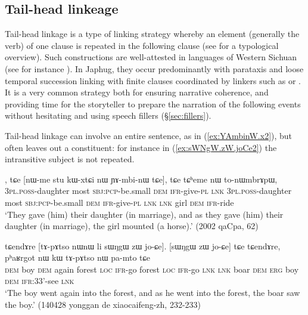 \subsection{Tail-head linkeage} \label{sec:tail.head.linkeage}
Tail-head linkage is a type of linking strategy whereby an element (generally the verb) of one clause  is repeated in the following clause (see \citealt{vries05tailhead} for a typological overview). Such constructions are well-attested in languages of Western Sichuan (see for instance \citealt[688--693]{zhangsh13ersu}). In Japhug, they occur predominantly with parataxis and loose temporal succession linking with finite clauses coordinated by linkers such as  or . It is a very common strategy both for ensuring narrative coherence, and providing time for the storyteller to prepare the narration of the following events without hesitating and using speech fillers (§\ref{sec:fillers}). 

Tail-head linkage can involve an entire sentence, as  in (\ref{ex:YAmbinW.x2}), but often leaves out a constituent: for instance in (\ref{ex:sWNgW.zW.joCe2}) the intransitive subject  is not repeated.

\begin{exe}
\ex \label{ex:YAmbinW.x2}
, tɕe [nɯ-me stu kɯ-xtɕi nɯ ɲɤ-mbi-nɯ tɕe], tɕe tɕʰeme nɯ to-nɯmbrɤpɯ, \\
\textsc{3pl}.\textsc{poss}-daughter most \textsc{sbj}:\textsc{pcp}-be.small \textsc{dem} \textsc{ifr}-give-\textsc{pl}  \textsc{lnk} \textsc{3pl}.\textsc{poss}-daughter most \textsc{sbj}:\textsc{pcp}-be.small \textsc{dem} \textsc{ifr}-give-\textsc{pl}  \textsc{lnk}  \textsc{lnk} girl \textsc{dem} \textsc{ifr}-ride \\
\glt `They gave (him) their daughter (in marriage), and as they gave (him) their daughter (in marriage),  the girl mounted (a horse).' (2002 qaCpa, 62)
\end{exe}


\begin{exe}
\ex \label{ex:sWNgW.zW.joCe2}
\gll tɕendɤre [tɤ-pɤtso nɯnɯ li sɯŋgɯ zɯ jo-ɕe]. [sɯŋgɯ zɯ jo-ɕe] tɕe tɕendɤre, pʰaʁrgot nɯ kɯ tɤ-pɤtso nɯ pa-mto tɕe \\
  \textsc{dem} boy \textsc{dem} again forest \textsc{loc} \textsc{ifr}-go  forest \textsc{loc} \textsc{ifr}-go \textsc{lnk} \textsc{lnk} boar \textsc{dem} \textsc{erg} boy \textsc{dem} \textsc{ifr}:3\fl{}3'-see \textsc{lnk}   \\
\glt `The boy went again into the forest, and as he went into the forest, the boar saw the boy.' (140428 yonggan de xiaocaifeng-zh, 232-233)
\end{exe}

